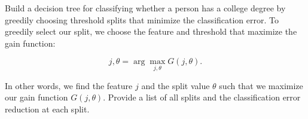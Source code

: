 \item {} Build a decision tree for classifying whether a person has a college degree by greedily choosing threshold splits that minimize the classification error. To greedily select our split, we choose the feature and threshold that maximize the gain function:

\[
j, \theta = \arg \max_{j, \theta} G(j, \theta).
\]

In other words, we find the feature \( j \) and the split value \( \theta \) such that we maximize our gain function \( G(j, \theta) \). Provide a list of all splits and the classification error reduction at each split.
